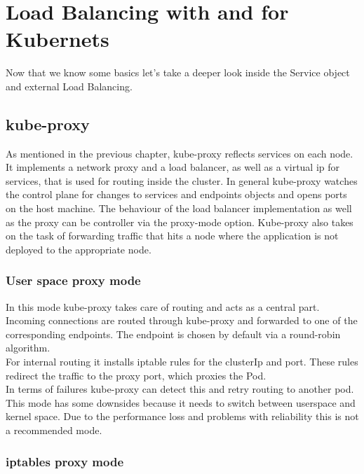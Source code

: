 \chapter{Load Balancing with and for Kubernets}

Now that we know some basics let's take a deeper look inside the Service object and external Load Balancing.

\section{kube-proxy}\label{sec:kubeproxy}

As mentioned in the previous chapter, kube-proxy reflects services on each node.
It implements a network proxy and a load balancer, as well as a virtual ip for services, that is used for routing inside the cluster.
In general kube-proxy watches the control plane for changes to services and endpoints objects and opens ports on the host machine.
The behaviour of the load balancer implementation as well as the proxy can be controller via the proxy-mode option.
Kube-proxy also takes on the task of forwarding traffic that hits a node where the application is not deployed to the appropriate node.~\cite{KUBERNETES-SERVICE}

\subsection{User space proxy mode}

In this mode kube-proxy takes care of routing and acts as a central part.
\\
Incoming connections are routed through kube-proxy and forwarded to one of the corresponding endpoints.
The endpoint is chosen by default via a round-robin algorithm.
\\
For internal routing it installs iptable rules for the clusterIp and port.
These rules redirect the traffic to the proxy port, which proxies the Pod.
\\
In terms of failures kube-proxy can detect this and retry routing to another pod.
\\
This mode has some downsides because it needs to switch between userspace and kernel space.
Due to the performance loss and problems with reliability this is not a recommended mode.~\cite{KUBERNETES-SERVICE}

\subsection{iptables proxy mode}

